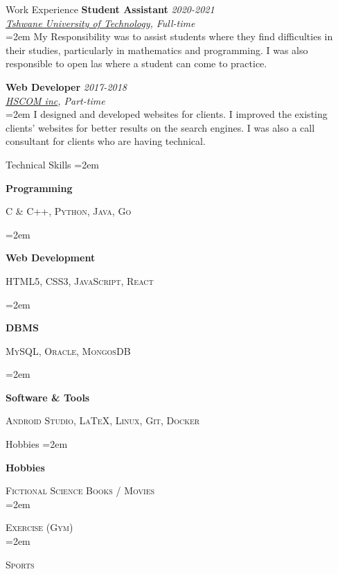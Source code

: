 \documentclass{resume} %
\newlength{\spacebox}
\newcommand{\sepspace}{\vspace*{1em}}           %
\newcommand{\EducationEntry}[4]{
        \noindent \textbf{#1} \hfill \textit{#2} \\     %
        \noindent \textit{#3} \\        %
        \noindent  #4  %
        \normalsize \par}
\newcommand{\WorkEntry}[4]{				  %
        \noindent \textbf{#1} \hfill \textit{#2} \\      %
        \noindent \textit{#3} \\              %
        \noindent\hangindent=2em\hangafter=0  #4 %
        \normalsize \par}
\newcommand{\SkillsEntry}[2]{      %
		\noindent\hangindent=2em\hangafter=0 %
		\parbox{\spacebox}{        %
    \textbf{#1}}			   %
    \hspace{1em} \textsc{#2} \par}    %
\newcommand{\HobbieEntry}[2]{      %
		\noindent\hangindent=2em\hangafter=0 %
		\parbox{\spacebox}{        %
    \textbf{#1}}			   %
    \hspace{1em} \textsc{#2} \\}    %
\begin{document}
\begin{rSection}{Work Experience}
        \WorkEntry{Student Assistant}{2020-2021}
        {\href{https://www.tut.ac.za/} {Tshwane University of Technology}, Full-time}
        {My Responsibility was to assist students where they find difficulties in their studies, particularly in mathematics and programming. I was also responsible to open las where a student can come to practice.}

        \WorkEntry{Web Developer}{2017-2018}
        {\href{https://www.hscom.co.za/} {HSCOM inc}, Part-time}
        {I designed and developed websites for clients. I improved the existing clients’ websites for better results on the search engines. I was also a call consultant for clients who are having technical.}


\end{rSection}

\pagebreak

\begin{rSection}{Technical Skills}
        \SkillsEntry{Programming}{C \& C++, Python, Java, Go}
        \SkillsEntry{Web Development}{HTML5, CSS3, JavaScript, React}
        \SkillsEntry{DBMS}{MySQL, Oracle, MongosDB}
        \SkillsEntry{Software \& Tools}{Android Studio, \LaTeX, Linux, Git, Docker }
\end{rSection}


\begin{rSection}{Hobbies}
        \HobbieEntry{Hobbies}{Fictional Science Books / Movies }
        \HobbieEntry{}{Exercise (Gym)}
        \HobbieEntry{}{Sports}
\end{rSection}
\end{document}
